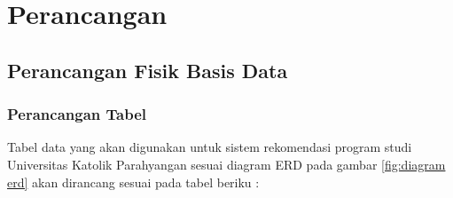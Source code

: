 \chapter{Perancangan}
\label{chap:perancangan}

\section{Perancangan Fisik Basis Data}

\subsection{Perancangan Tabel}
\label{sec:perancngan tabel}

Tabel data yang akan digunakan untuk sistem rekomendasi program studi Universitas Katolik Parahyangan sesuai diagram ERD pada gambar \ref{fig:diagram erd} akan dirancang sesuai pada tabel beriku :

